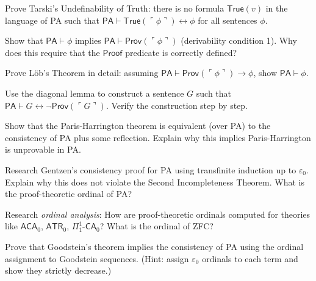 \begin{exercise}[Intermediate]
Prove Tarski's Undefinability of Truth: there is no formula $\mathsf{True}(v)$ in the language of PA such that $\mathsf{PA} \vdash \mathsf{True}(\ulcorner \phi \urcorner) \leftrightarrow \phi$ for all sentences $\phi$.
\end{exercise}

\begin{exercise}[Intermediate]
Show that $\mathsf{PA} \vdash \phi$ implies $\mathsf{PA} \vdash \mathsf{Prov}(\ulcorner \phi \urcorner)$ (derivability condition 1). Why does this require that the $\mathsf{Proof}$ predicate is correctly defined?
\end{exercise}

\begin{exercise}[Advanced]
Prove Löb's Theorem in detail: assuming $\mathsf{PA} \vdash \mathsf{Prov}(\ulcorner \phi \urcorner) \to \phi$, show $\mathsf{PA} \vdash \phi$.
\end{exercise}

\begin{exercise}[Advanced]
Use the diagonal lemma to construct a sentence $G$ such that $\mathsf{PA} \vdash G \leftrightarrow \neg \mathsf{Prov}(\ulcorner G \urcorner)$. Verify the construction step by step.
\end{exercise}

\begin{exercise}[Advanced]
Show that the Paris-Harrington theorem is equivalent (over PA) to the consistency of PA plus some reflection. Explain why this implies Paris-Harrington is unprovable in PA.
\end{exercise}

\begin{exercise}[Challenge]
Research Gentzen's consistency proof for PA using transfinite induction up to $\varepsilon_0$. Explain why this does not violate the Second Incompleteness Theorem. What is the proof-theoretic ordinal of PA?
\end{exercise}

\begin{exercise}[Challenge]
Research \emph{ordinal analysis}: How are proof-theoretic ordinals computed for theories like $\mathsf{ACA}_0$, $\mathsf{ATR}_0$, $\Pi^1_1\text{-}\mathsf{CA}_0$? What is the ordinal of ZFC?
\end{exercise}

\begin{exercise}[Challenge]
Prove that Goodstein's theorem implies the consistency of PA using the ordinal assignment to Goodstein sequences. (Hint: assign $\varepsilon_0$ ordinals to each term and show they strictly decrease.)
\end{exercise}

